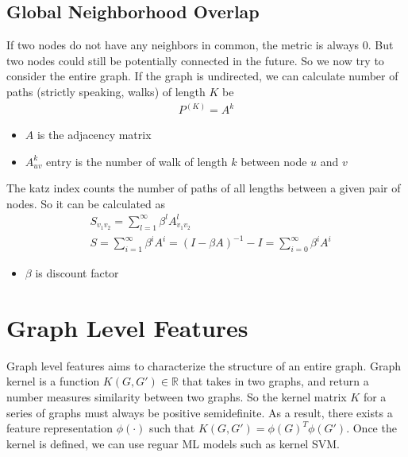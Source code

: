 \subsection{Global Neighborhood Overlap}
If two nodes do not have any neighbors in common, the metric is always 0. But two nodes could still be potentially connected in the future. So we now try to consider the entire graph. If the graph is undirected, we can calculate number of paths (strictly speaking, walks) of length $K$ be 
    \begin{align*}
        P^{(K)} = A^k
    \end{align*}
    \begin{itemize}
        \item $A$ is the adjacency matrix
        \item $A^k_{uv}$ entry is the number of walk of length $k$ between node $u$ and $v$
    \end{itemize}
The katz index counts the number of paths of all lengths between a given pair of nodes. So it can be calculated as 
    \begin{align*}
        & S_{v_1v_2} = \sum_{l=1}^\infty \beta^l A^l_{v_1v_2} \\
        & S = \sum_{i=1}^\infty \beta^iA^i = (I -\beta A)^{-1}-I = \sum_{i=0}^\infty \beta^i A^i
    \end{align*}
    \begin{itemize}
        \item $\beta$ is discount factor
    \end{itemize}
    
\section{Graph Level Features} 
Graph level features aims to characterize the structure of an entire graph. Graph kernel is a function $K(G, G')\in \mathbb{R}$ that takes in two graphs, and return a number measures similarity between two graphs. So the kernel matrix $K$ for a series of graphs must always be positive semidefinite. As a result, there exists a feature representation $\phi(\cdot)$ such that $K(G,G') = \phi(G)^T\phi(G')$. Once the kernel is defined, we can use reguar ML models such as kernel SVM. 

